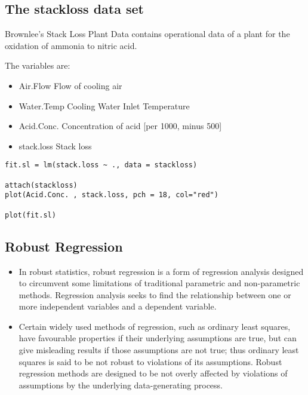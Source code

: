 \documentclass[residuals.tex]{subfiles}
\begin{document}
\subsection{The stackloss data set}
Brownlee's Stack Loss Plant Data contains operational data of a plant for the oxidation of ammonia to nitric acid.

The variables are: 
\begin{itemize}
\item	Air.Flow	 Flow of cooling air
\item	Water.Temp	 Cooling Water Inlet Temperature
\item	Acid.Conc.	 Concentration of acid [per 1000, minus 500]
\item	stack.loss	 Stack loss
\end{itemize}

\begin{framed}
\begin{verbatim}
fit.sl = lm(stack.loss ~ ., data = stackloss)

attach(stackloss)
plot(Acid.Conc. , stack.loss, pch = 18, col="red")

plot(fit.sl)
\end{verbatim}
\end{framed}
\newpage


\subsection*{Robust Regression }
\begin{itemize}
\item In robust statistics, robust regression is a form of regression analysis designed to circumvent some 
limitations of traditional parametric and non-parametric methods. Regression analysis seeks to find the 
relationship between one or more independent variables and a dependent variable. 
\item Certain widely used methods of regression, such as ordinary least squares, have favourable properties if their
underlying assumptions are true, but can give misleading results if those assumptions are not true; thus
ordinary least squares is said to be not robust to violations of its assumptions. Robust regression methods are designed to be not overly affected by violations of assumptions by the underlying data-generating process.
\end{itemize}
\newpage
\end{document}
